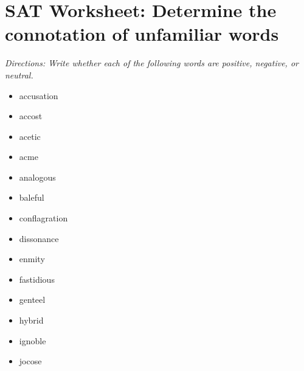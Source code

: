 \section{SAT Worksheet: Determine the connotation of unfamiliar words}

\textit{Directions: Write whether each of the following words are positive, negative, or neutral.}

\begin{itemize}
\item accusation \underline{\hspace{2in}}

\item accost \underline{\hspace{2in}}

\item acetic \underline{\hspace{2in}}

\item acme \underline{\hspace{2in}}

\item analogous  \underline{\hspace{2in}}

\item baleful  \underline{\hspace{2in}}

\item conflagration \underline{\hspace{2in}}

\item dissonance \underline{\hspace{2in}}

\item enmity \underline{\hspace{2in}}

\item fastidious \underline{\hspace{2in}}

\item genteel \underline{\hspace{2in}}

\item hybrid \underline{\hspace{2in}}

\item ignoble \underline{\hspace{2in}}

\item jocose \underline{\hspace{2in}}


\end{itemize}
